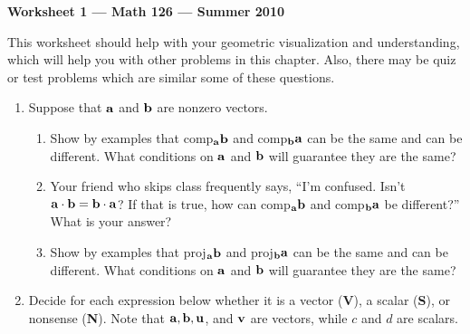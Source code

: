 \documentclass[12pt]{article}
\newcommand{\vb}{\bf}
\begin{document}
\begin{center}
\bf{Worksheet 1 --- Math 126 --- Summer 2010}
\end{center}
\bigskip
This worksheet should help with your geometric visualization and
understanding, which will help you with other problems in this
chapter.  Also, there may be quiz or test problems which are similar
some of these questions.

\begin{enumerate}
\item Suppose that $\vb{a}$ and $\vb{b}$ are nonzero vectors.
 \begin{enumerate}
        \item Show by examples that comp$_{\vb{a}}\vb{b}$
                                and  comp$_{\vb{b}}\vb{a}$
        can be the same and can be different.
        What conditions on  $\vb{a}$ and $\vb{b}$ will
                guarantee they are the same?
        \item Your friend who skips class frequently says, ``I'm confused.
        Isn't $\vb{a} \cdot \vb{b} = \vb{b} \cdot \vb{a}$?
        If that is true, how can  comp$_{\vb{a}}\vb{b}$
                                and  comp$_{\vb{b}}\vb{a}$
        be different?''  What is your answer?
        \item Show by examples that proj$_{\vb{a}}\vb{b}$
                                and  proj$_{\vb{b}}\vb{a}$
        can be the same and can be different.
        What conditions on   $\vb{a}$ and $\vb{b}$ will
                guarantee they are the same?
 \end{enumerate}

\item Decide for each expression below whether it is a vector (\textbf{V}),
a scalar (\textbf{S}), or nonsense (\textbf{N}).
Note that $\vb{a}, \vb{b}, \vb{u}$, and $\vb{v}$ are vectors, while
$c$ and $d$ are scalars.


\end{enumerate}
\end{document}
